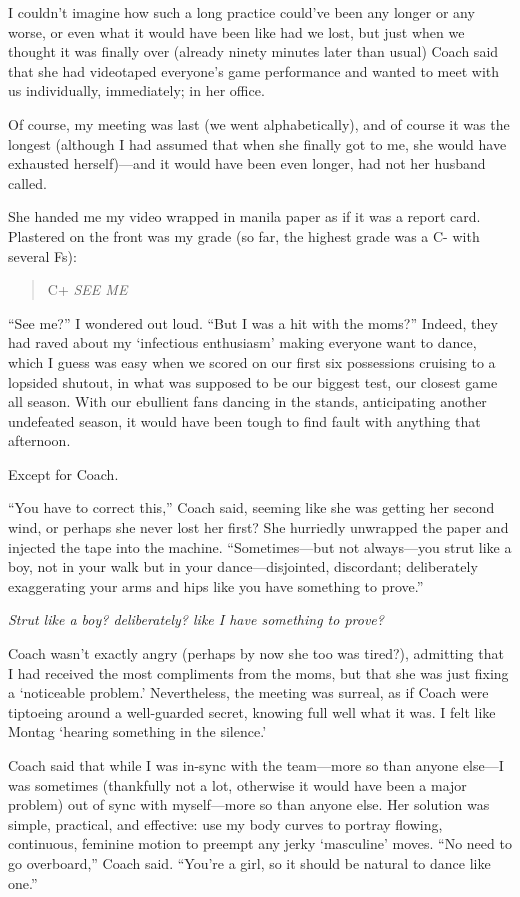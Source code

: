 I couldn't imagine how such a long practice could've been any longer or
any worse, or even what it would have been like had we lost, but just
when we thought it was finally over (already ninety minutes later than
usual) Coach said that she had videotaped everyone's game performance
and wanted to meet with us individually, immediately; in her office.

Of course, my meeting was last (we went alphabetically), and of course
it was the longest (although I had assumed that when she finally got to
me, she would have exhausted herself)---and it would have been even
longer, had not her husband called.

She handed me my video wrapped in manila paper as if it was a report
card. Plastered on the front was my grade (so far, the highest grade was
a C- with several Fs):

\begin{quote}
C+ \emph{SEE ME}
\end{quote}

\noindent ``See me?'' I wondered out loud. ``But I was a hit with the
moms?'' Indeed, they had raved about my `infectious enthusiasm' making
everyone want to dance, which I guess was easy when we scored on our
first six possessions cruising to a lopsided shutout, in what was
supposed to be our biggest test, our closest game all season. With our
ebullient fans dancing in the stands, anticipating another undefeated
season, it would have been tough to find fault with anything that
afternoon.

Except for Coach.

``You have to correct this,'' Coach said, seeming like she was getting
her second wind, or perhaps she never lost her first? She hurriedly
unwrapped the paper and injected the tape into the machine.
``Sometimes---but not always---you strut like a boy, not in your walk
but in your dance---disjointed, discordant; deliberately exaggerating
your arms and hips like you have something to prove.''

\emph{Strut like a boy? deliberately? like I have something to prove?}

Coach wasn't exactly angry (perhaps by now she too was tired?),
admitting that I had received the most compliments from the moms, but
that she was just fixing a `noticeable problem.' Nevertheless, the
meeting was surreal, as if Coach were tiptoeing around a well-guarded
secret, knowing full well what it was. I felt like Montag `hearing
something in the silence.'

Coach said that while I was in-sync with the team---more so than anyone
else---I was sometimes (thankfully not a lot, otherwise it would have
been a major problem) out of sync with myself---more so than anyone
else. Her solution was simple, practical, and effective: use my body
curves to portray flowing, continuous, feminine motion to preempt any
jerky `masculine' moves. ``No need to go overboard,'' Coach said.
``You're a girl, so it should be natural to dance like one.''

